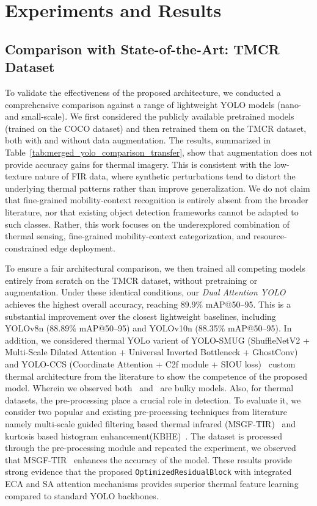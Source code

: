 \documentclass[journal,twoside,web]{ieeecolor}
\begin{document}
\section{Experiments and Results}
\subsection{Comparison with State-of-the-Art: TMCR Dataset}

To validate the effectiveness of the proposed architecture, we conducted a comprehensive comparison against a range of lightweight YOLO models (nano- and small-scale). {We first considered the publicly available pretrained models (trained on the COCO dataset) and then retrained them on the TMCR dataset, both with and without data augmentation. The results, summarized in Table~\ref{tab:merged_yolo_comparison_transfer}, show that augmentation does not provide accuracy gains for thermal imagery. This is consistent with the low-texture nature of FIR data, where synthetic perturbations tend to distort the underlying thermal patterns rather than improve generalization. We do not claim that fine-grained mobility-context recognition is entirely absent from the broader literature, nor that existing object detection frameworks cannot be adapted to such classes. Rather, this work focuses on the underexplored combination of thermal sensing, fine-grained mobility-context categorization, and resource-constrained edge deployment.}


To ensure a fair architectural comparison, we then trained all competing models entirely from scratch on the TMCR dataset, without pretraining or augmentation. Under these identical conditions, our \textit{Dual Attention YOLO} achieves the highest overall accuracy, reaching 89.9\% mAP@50--95. This is a substantial improvement over the closest lightweight baselines, including YOLOv8n (88.89\% mAP@50--95) and YOLOv10n (88.35\% mAP@50--95). {In addition, we considered thermal YOLo varient of YOLO-SMUG (ShuffleNetV2 + Multi-Scale Dilated Attention + Universal Inverted Bottleneck + GhostConv)~\cite{luo2025yolo} and YOLO-CCS (Coordinate Attention + C2f module + SIOU loss)~\cite{li2024yolo} custom thermal architecture from the literature to show the competence of the proposed model. Wherein we observed both~\cite{luo2025yolo} and~\cite{li2024yolo} are bulky models. Also, for thermal datasets, the pre-processing place a crucial role in detection. To evaluate it, we consider two popular and existing pre-processing techniques from literature namely multi-scale guided filtering based thermal infrared (MSGF-TIR)~\cite{li2024thermal} and kurtosis based histogram enhancement(KBHE)~\cite{mudavath2025person}. The dataset is processed through the pre-processing module and repeated the experiment, we observed that MSGF-TIR~\cite{li2024thermal} enhances the accuracy of the model.} These results provide strong evidence that the proposed \texttt{OptimizedResidualBlock} with integrated ECA and SA attention mechanisms provides superior thermal feature learning compared to standard YOLO backbones.
\end{document}
